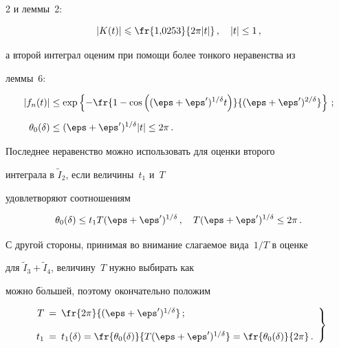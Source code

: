 \begin{multicols}{2}
и леммы~2:


$$


\left| K(t)\right| \leqslant \fr{1{,}0253}{2\pi|t|}\,,\quad |t|\le1\,,


$$


а второй интеграл оценим при помощи более тонкого неравенства из


леммы~6:


\begin{align*}


\left|f_n(t)\right|&\le \exp\left\{


-\fr{1-\cos\left((\eps+\eps')^{1/\delta}t\right)}


{(\eps+\eps')^{2/\delta}} \right\}\,;\\[6pt]


\theta_0(\delta) &\le


(\eps+\eps')^{1/\delta}|t|\le 2\pi\,.


\end{align*}


Последнее неравенство можно использовать для оценки второго


интеграла в $\widetilde I_2$, если величины~$t_1$ и~$T$


удовлетворяют соотношениям


$$


\theta_0(\delta)\le t_1 T(\eps+\eps')^{1/\delta}\,,\quad


T(\eps+\eps')^{1/\delta}\le 2\pi\,.


$$


С другой стороны, принимая во внимание сла\-га\-емое вида~$1/T$ в оценке


для $\widetilde I_3+\widetilde I_4$, величину~$T$ нужно выбирать как


можно б$\acute{\mbox{о}}$льшей, поэтому окончательно положим


\begin{equation}


\left.


\begin{array}{rcl}


T\!\!\!&=&\!\!\!\fr{2\pi}{(\eps+\eps')^{1/\delta}}\,;\\[12pt]


t_1\!\!\!&=&\!\!\!t_1(\delta)=\fr{\theta_0(\delta)}{T(\eps+\eps')^{1/\delta}}=


\fr{\theta_0(\delta)}{2\pi}\,.


\end{array}


\right \}



\end{equation}
\end{multicols}
